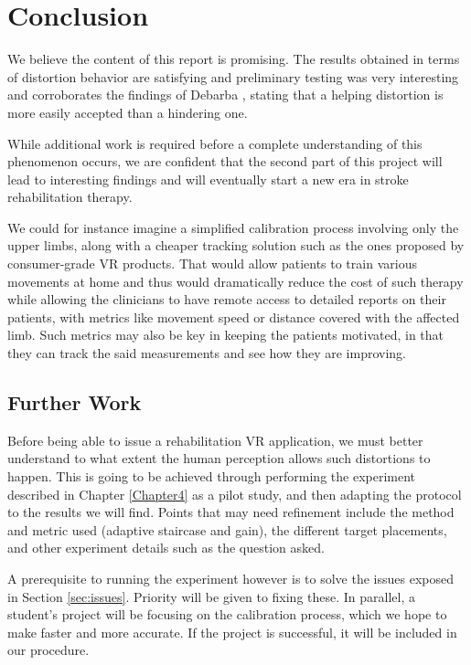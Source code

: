 
\chapter{Conclusion} %

\label{Chapter6}

We believe the content of this report is promising. The results obtained in terms of distortion behavior are satisfying and preliminary testing was very interesting and corroborates the findings of Debarba \cite{debarba2017embodiment}, stating that a helping distortion is more easily accepted than a hindering one.

While additional work is required before a complete understanding of this phenomenon occurs, we are confident that the second part of this project will lead to interesting findings and will eventually start a new era in stroke rehabilitation therapy.

We could for instance imagine a simplified calibration process involving only the upper limbs, along with a cheaper tracking solution such as the ones proposed by consumer-grade VR products. That would allow patients to train various movements at home and thus would dramatically reduce the cost of such therapy while allowing the clinicians to have remote access to detailed reports on their patients, with metrics like movement speed or distance covered with the affected limb. Such metrics may also be key in keeping the patients motivated, in that they can track the said measurements and see how they are improving.

\section{Further Work}

Before being able to issue a rehabilitation VR application, we must better understand to what extent the human perception allows such distortions to happen. This is going to be achieved through performing the experiment described in Chapter \ref{Chapter4} as a pilot study, and then adapting the protocol to the results we will find. Points that may need refinement include the method and metric used (adaptive staircase and gain), the different target placements, and other experiment details such as the question asked.

A prerequisite to running the experiment however is to solve the issues exposed in Section \ref{sec:issues}. Priority will be given to fixing these. In parallel, a student's project will be focusing on the calibration process, which we hope to make faster and more accurate. If the project is successful, it will be included in our procedure.

